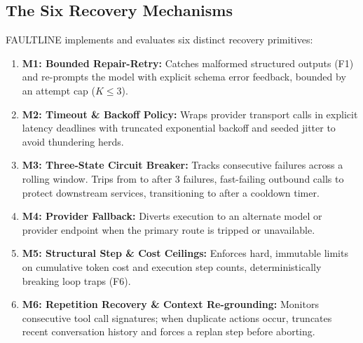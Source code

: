 \begin{center}
{%
}
\vspace{0.2em}
\label{fig:recovery_path}
\end{center}

\subsection{The Six Recovery Mechanisms}
FAULTLINE implements and evaluates six distinct recovery primitives:
\begin{enumerate}
    \item \textbf{M1: Bounded Repair-Retry:} Catches malformed structured outputs (F1) and re-prompts the model with explicit schema error feedback, bounded by an attempt cap ($K \le 3$).
    \item \textbf{M2: Timeout \& Backoff Policy:} Wraps provider transport calls in explicit latency deadlines with truncated exponential backoff and seeded jitter to avoid thundering herds.
    \item \textbf{M3: Three-State Circuit Breaker:} Tracks consecutive failures across a rolling window. Trips from  to  after 3 failures, fast-failing outbound calls to protect downstream services, transitioning to  after a cooldown timer.
    \item \textbf{M4: Provider Fallback:} Diverts execution to an alternate model or provider endpoint when the primary route is tripped or unavailable.
    \item \textbf{M5: Structural Step \& Cost Ceilings:} Enforces hard, immutable limits on cumulative token cost and execution step counts, deterministically breaking loop traps (F6).
    \item \textbf{M6: Repetition Recovery \& Context Re-grounding:} Monitors consecutive tool call signatures; when duplicate actions occur, truncates recent conversation history and forces a replan step before aborting.
\end{enumerate}

